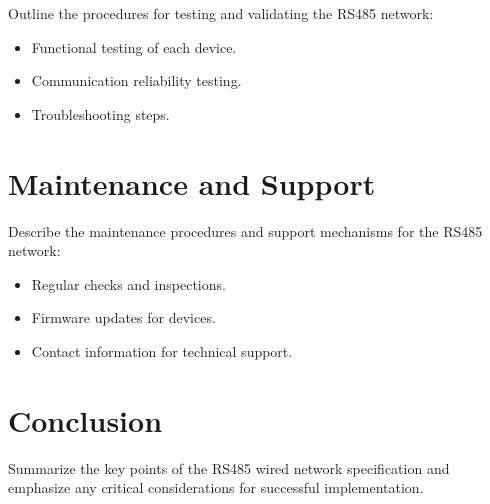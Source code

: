 \documentclass[a4paper,12pt]{article}
\begin{document}
	Outline the procedures for testing and validating the RS485 network:
	
	\begin{itemize}[label=--]
		\item Functional testing of each device.
		\item Communication reliability testing.
		\item Troubleshooting steps.
	\end{itemize}
	
	\section{Maintenance and Support}
	
	Describe the maintenance procedures and support mechanisms for the RS485 network:
	
	\begin{itemize}[label=--]
		\item Regular checks and inspections.
		\item Firmware updates for devices.
		\item Contact information for technical support.
	\end{itemize}
	
	\section{Conclusion}
	
	Summarize the key points of the RS485 wired network specification and emphasize any critical considerations for successful implementation.
	
\end{document}
